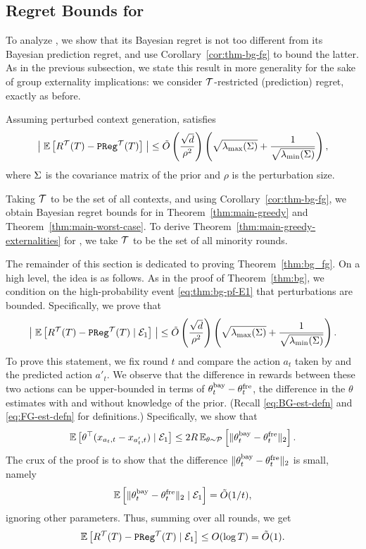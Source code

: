 \subsection{Regret Bounds for \FreqGreedy}
\label{sec:bg-proofs-fg}

To analyze \fg, we show that its Bayesian regret is not too different from its Bayesian prediction regret, and use Corollary~\ref{cor:thm-bg-fg} to bound the latter. As in the previous subsection, we state this result in more generality for the sake of group externality implications: we consider $\mathcal{T}$-restricted (prediction) regret, exactly as before.

\begin{theorem}
  Assuming perturbed context generation, \fg satisfies
  \[  \left|\; \mathbb{E}\left[R^{{\mathcal{T}}}(T) - \mathtt{PReg}^{{\mathcal{T}}}(T)\right] \; \right| \leq
    \tilde O\left(\frac{\sqrt{d}}{\rho^2}\right) \left(\sqrt{\lambda_{\max}(\Sigma)} +
    \frac{1}{\sqrt{\lambda_{\min}(\Sigma)}}\right),
  \]
  where $\Sigma$ is the covariance matrix of the prior and $\rho$ is the perturbation size.
  \label{thm:bg_fg}
\end{theorem}

Taking $\mathcal{T}$ to be the set of all contexts, and using Corollary~\ref{cor:thm-bg-fg}, we obtain Bayesian regret bounds for \fg in Theorem~\ref{thm:main-greedy} and Theorem~\ref{thm:main-worst-case}.
To derive Theorem~\ref{thm:main-greedy-externalities} for \fg, we take $\mathcal{T}$ to be the set of all minority rounds.

The remainder of this section is dedicated to proving Theorem~\ref{thm:bg_fg}. On a high level, the idea is as follows. As in the proof of Theorem~\ref{thm:bg}, we condition on the high-probability event \eqref{eq:thm:bg-pf-E1} that perturbations are bounded. Specifically, we prove that
\begin{align}\label{eq:thm:bg_fg-cond}
  \left|\; \mathbb{E}\left[R^{{\mathcal{T}}}(T) - \mathtt{PReg}^{{\mathcal{T}}}(T) \;|\; \mathcal{E}_1\right] \; \right| \leq
    \tilde O\left(\frac{\sqrt{d}}{\rho^2}\right) \left(\sqrt{\lambda_{\max}(\Sigma)} +
    \frac{1}{\sqrt{\lambda_{\min}(\Sigma)}}\right).
\end{align}
To prove this statement, we fix round $t$ and compare the action $a_t$ taken by \fg and the predicted action $a'_t$. We observe that the difference in rewards between these two actions can be upper-bounded in terms of $\theta_t^{\textrm{bay}}-\theta_{t}^{\textrm{fre}}$,
the difference in the $\theta$ estimates with and without knowledge of the prior. (Recall \eqref{eq:BG-est-defn} and \eqref{eq:FG-est-defn} for definitions.)
Specifically, we show that
\begin{equation}
\label{eq:inst_bound_diff}
  \mathbb{E}\left[
    \theta^{\top} (x_{a_t, t} - x_{a'_t, t}) \;|\; \mathcal{E}_1 \right]
    \le 2R\operatorname{\mathbb{E}}_{\theta \sim \mathcal{P}}\left[\|\theta_t^{\textrm{bay}} - \theta_{t}^{\textrm{fre}}\|_2\right].
\end{equation}
The crux of the proof is to show that the difference $\|\theta_t^{\textrm{bay}} - \theta_{t}^{\textrm{fre}}\|_2$ is small, namely
\begin{equation}
  \label{eq:norm_bound_1_t}
  \mathbb{E}\left[\|\theta_t^{\textrm{bay}}-\theta_{t}^{\textrm{fre}}\|_2 \;|\; \mathcal{E}_1\right] = \tilde O(1/t),
\end{equation}
ignoring other parameters. Thus, summing over all rounds, we get
\[ \mathbb{E}\left[R^{{\mathcal{T}}}(T) - \mathtt{PReg}^{{\mathcal{T}}}(T) \;|\;
\mathcal{E}_1\right] \le O(\log T) = \tilde O(1). \]

